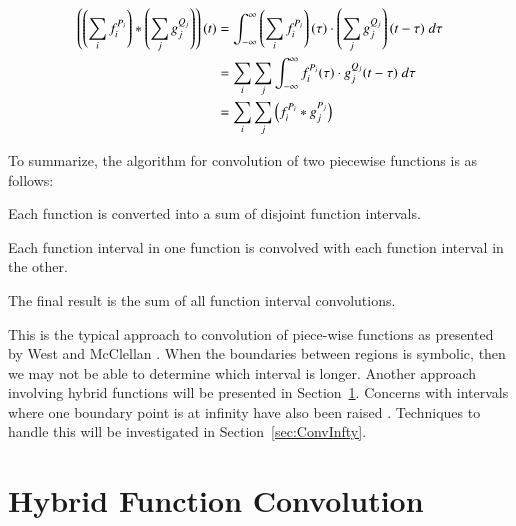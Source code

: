 \begin{align}
	\label{eqn:ConvPiecewise}
	\left(\left(\sum_i f_i^{P_i}\right) * \left(\sum_j g_j^{Q_j}\right)\right) (t)
	&= \int_{-\infty}^\infty \left(\sum_i f_i^{P_i}\right)(\tau)\cdot \left(\sum_j g_j^{Q_j}\right)(t-\tau) \;d\tau
	\notag\\&= \sum_i \sum_j \int_{-\infty}^\infty f_i^{P_i}(\tau) \cdot g_j^{Q_j}(t-\tau) \;d\tau 
	\notag\\&= \sum_i \sum_j \left(f_i^{P_i} * g_j^{P_j}\right)
\end{align}

To summarize, the algorithm for convolution of two piecewise functions is as follows:
\begin{enumerate*}
	\item Each function is converted into a sum of disjoint function intervals.
	\item Each function interval in one function is convolved with each function interval in the other.
	\item The final result is the sum of all function interval convolutions.
\end{enumerate*}


This is the typical approach to convolution of piece-wise functions as presented by West and McClellan  
\cite{west1993symbolic}.
When the boundaries between regions is symbolic, then we may not be able to determine which interval is longer.
Another approach involving hybrid functions will be presented in Section~\ref{sec:HFConvolution}. 
Concerns with intervals where one boundary point is at infinity have also been raised \cite{evans1994algorithms}.
Techniques to handle this will be investigated in Section~\ref{sec:ConvInfty}.




%
%
\section{Hybrid Function Convolution}
\label{sec:HFConvolution}

